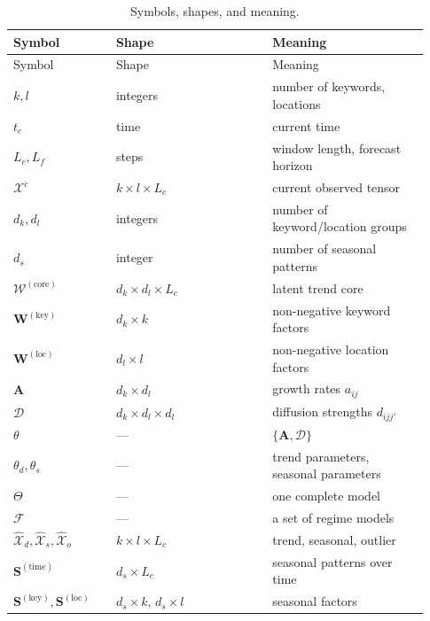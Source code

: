\begin{longtable}{@{}>{\raggedright\arraybackslash}p{0.23\linewidth}>{\raggedright\arraybackslash}p{0.35\linewidth}>{\raggedright\arraybackslash}p{0.35\linewidth}@{}}
  \caption{Symbols, shapes, and meaning.}\label{tab:appendix-symbols}\\
  \toprule
  Symbol & Shape & Meaning \\
  \midrule
  \endfirsthead
  \toprule
  Symbol & Shape & Meaning \\
  \midrule
  \endhead
  $k,l$ & integers & number of keywords, locations \\
  $t_c$ & time & current time \\
  $L_c,L_f$ & steps & window length, forecast horizon \\
  $\mathcal{X}^{c}$ & $k\times l\times L_c$ & current observed tensor \\
  $d_k,d_l$ & integers & number of keyword/location groups \\
  $d_s$ & integer & number of seasonal patterns \\
  $\mathcal{W}^{(\mathrm{core})}$ & $d_k\times d_l\times L_c$ & latent trend core \\
  $\mathbf{W}^{(\mathrm{key})}$ & $d_k\times k$ & non-negative keyword factors \\
  $\mathbf{W}^{(\mathrm{loc})}$ & $d_l\times l$ & non-negative location factors \\
  $\mathbf{A}$ & $d_k\times d_l$ & growth rates $a_{ij}$ \\
  $\mathcal{D}$ & $d_k\times d_l\times d_l$ & diffusion strengths $d_{ijj'}$ \\
  $\theta$ & --- & $\{\mathbf{A},\mathcal{D}\}$ \\
  $\theta_d,\theta_s$ & --- & trend parameters, seasonal parameters \\
  $\Theta$ & --- & one complete model \\
  $\mathcal{F}$ & --- & a set of regime models \\
  $\widehat{\mathcal{X}}_d,\widehat{\mathcal{X}}_s,\widehat{\mathcal{X}}_o$ & $k\times l\times L_c$ & trend, seasonal, outlier \\
  $\mathbf{S}^{(\mathrm{time})}$ & $d_s\times L_c$ & seasonal patterns over time \\
  $\mathbf{S}^{(\mathrm{key})},\mathbf{S}^{(\mathrm{loc})}$ & $d_s\times k$, $d_s\times l$ & seasonal factors \\
  \bottomrule
\end{longtable}

